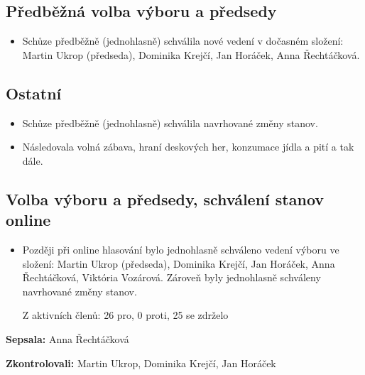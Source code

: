 \documentclass[11pt,a4paper]{article}
\begin{document}
\subsection*{Předběžná volba výboru a předsedy}
\begin{itemize}[itemsep=0pt]
\item Schůze předběžně (jednohlasně) schválila nové vedení v dočasném složení: Martin Ukrop (předseda), Dominika Krejčí, Jan Horáček, Anna Řechtáčková.
\end{itemize}

\subsection*{Ostatní}
\begin{itemize}[itemsep=0pt]
\item Schůze předběžně (jednohlasně) schválila navrhované změny stanov.
\item Následovala volná zábava, hraní deskových her, konzumace jídla a pití a tak dále.
\end{itemize}

\subsection*{Volba výboru a předsedy, schválení stanov online}
\begin{itemize}[itemsep=0pt]
\item Později při online hlasování bylo jednohlasně schváleno vedení výboru ve složení: Martin Ukrop (předseda), Dominika Krejčí, Jan Horáček, Anna Řechtáčková, Viktória Vozárová. Zároveň byly jednohlasně schváleny navrhované změny stanov.

Z aktivních členů: 26 pro, 0 proti, 25 se zdrželo
\end{itemize}

\textbf{Sepsala:} Anna Řechtáčková

\textbf{Zkontrolovali:} Martin Ukrop, Dominika Krejčí, Jan Horáček
\end{document}
